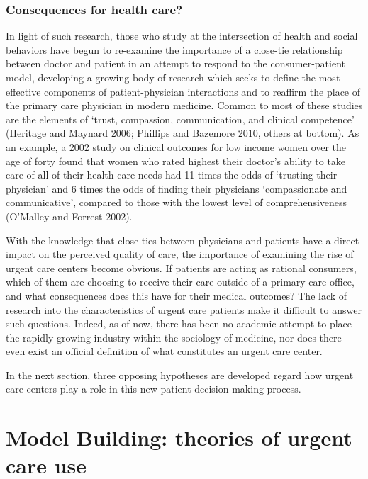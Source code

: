 \documentclass[12pt,twoside]{reedthesis}
\begin{document}
  \subsection*{Consequences for health
  care?}\label{consequences-for-health-care}
  
  In light of such research, those who study at the intersection of health
  and social behaviors have begun to re-examine the importance of a
  close-tie relationship between doctor and patient in an attempt to
  respond to the consumer-patient model, developing a growing body of
  research which seeks to define the most effective components of
  patient-physician interactions and to reaffirm the place of the primary
  care physician in modern medicine. Common to most of these studies are
  the elements of `trust, compassion, communication, and clinical
  competence' (Heritage and Maynard 2006; Phillips and Bazemore 2010,
  others at bottom). As an example, a 2002 study on clinical outcomes for
  low income women over the age of forty found that women who rated
  highest their doctor's ability to take care of all of their health care
  needs had 11 times the odds of `trusting their physician' and 6 times
  the odds of finding their physicians `compassionate and communicative',
  compared to those with the lowest level of comprehensiveness (O'Malley
  and Forrest 2002).
  
  With the knowledge that close ties between physicians and patients have
  a direct impact on the perceived quality of care, the importance of
  examining the rise of urgent care centers become obvious. If patients
  are acting as rational consumers, which of them are choosing to receive
  their care outside of a primary care office, and what consequences does
  this have for their medical outcomes? The lack of research into the
  characteristics of urgent care patients make it difficult to answer such
  questions. Indeed, as of now, there has been no academic attempt to
  place the rapidly growing industry within the sociology of medicine, nor
  does there even exist an official definition of what constitutes an
  urgent care center.
  
  In the next section, three opposing hypotheses are developed regard how
  urgent care centers play a role in this new patient decision-making
  process.
  
  \chapter*{Model Building: theories of urgent care
  use}\label{model-building-theories-of-urgent-care-use}
  
\end{document}
